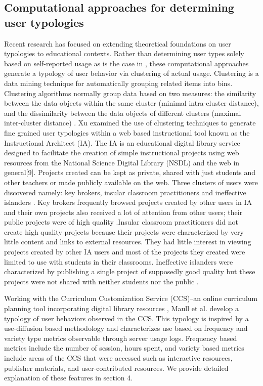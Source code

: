 \documentclass{acm_proc_article-sp}
\begin{document}
\subsection{Computational approaches for determining user typologies}
Recent research has focused on extending theoretical foundations on user typologies to educational contexts. Rather than determining user types solely based on self-reported usage as is the case in \cite{shih2004beyond,ram1990conceptualization}, these computational approaches generate a typology of user behavior via clustering of actual usage. Clustering is a data mining technique for automatically grouping related items into bins. Clustering algorithms normally group data based on two measures: the similarity between the data objects within the same cluster (minimal intra-cluster distance), and the dissimilarity between the data objects of different clusters (maximal inter-cluster distance) \cite{han2006data}. Xu \cite{xu} examined the use of clustering techniques to generate fine grained user typologies within a web based instructional tool known as the Instructional Architect (IA). The IA is an educational digital library service designed to facilitate the creation of simple instructional projects using web resources from the National Science Digital Library (NSDL) and the web in general[9]. Projects created can be kept as private, shared with just students and other teachers or made publicly available on the web. Three clusters of users were discovered namely: key brokers, insular classroom practitioners and ineffective islanders \cite{xu}.  Key brokers frequently browsed projects created by other users in IA and their own projects also received a lot of attention from other users; their public projects were of high quality \cite{xu}.Insular classroom practitioners did not create high quality projects because their projects were characterized by very little content and links to external resources. They had little interest in viewing projects created by other IA users and most of the projects they created were limited to use with students in their classrooms. Ineffective islanders were characterized by publishing a single project of supposedly good quality but these projects were not shared with neither students nor the public \cite{xu}.

Working with the Curriculum Customization Service (CCS)--an online curriculum planning tool incorporating digital library resources \cite{sumner:team}, Maull et al. \cite{maullunderstanding} develop a typology of user behaviors observed in the CCS. This typology is inspired by a use-diffusion based  methodology and characterizes use based on  frequency and variety type metrics observable through server usage logs. Frequency based metrics include the number of session, hours spent, and variety based metrics include areas of the CCS that were accessed such as interactive resources, publisher materials, and user-contributed resources. We provide detailed explanation of these features in section 4. 
\end{document}
